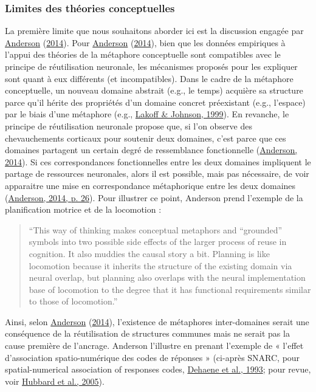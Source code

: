 \documentclass[
  a4paper,12pt,twoside,onecolumn,openright,final,oldfontcommands]{memoir}
\begin{document}
\hypertarget{lim-con}{%
\subsubsection{Limites des théories conceptuelles}\label{lim-con}}

La première limite que nous souhaitons aborder ici est la discussion engagée par \protect\hyperlink{ref-anderson_after_2014}{Anderson} (\protect\hyperlink{ref-anderson_after_2014}{2014}). Pour \protect\hyperlink{ref-anderson_after_2014}{Anderson} (\protect\hyperlink{ref-anderson_after_2014}{2014}), bien que les données empiriques à l'appui des théories de la métaphore conceptuelle sont compatibles avec le principe de réutilisation neuronale, les mécanismes proposés pour les expliquer sont quant à eux différents (et incompatibles). Dans le cadre de la métaphore conceptuelle, un nouveau domaine abstrait (e.g., le temps) acquière sa structure parce qu'il hérite des propriétés d'un domaine concret préexistant (e.g., l'espace) par le biais d'une métaphore (e.g., \protect\hyperlink{ref-lakoff_philosophy_1999}{Lakoff \& Johnson, 1999}). En revanche, le principe de réutilisation neuronale propose que, si l'on observe des chevauchements corticaux pour soutenir deux domaines, c'est parce que ces domaines partagent un certain degré de ressemblance fonctionnelle (\protect\hyperlink{ref-anderson_after_2014}{Anderson, 2014}). Si ces correspondances fonctionnelles entre les deux domaines impliquent le partage de ressources neuronales, alors il est possible, mais pas nécessaire, de voir apparaitre une mise en correspondance métaphorique entre les deux domaines (\protect\hyperlink{ref-anderson_after_2014}{Anderson, 2014, p. 26}). Pour illustrer ce point, Anderson prend l'exemple de la planification motrice et de la locomotion :

\begin{quote}
``This way of thinking makes conceptual metaphors and ``grounded'' symbols into two possible side effects of the larger process of reuse in cognition. It also muddies the causal story a bit. Planning is like locomotion because it inherits the structure of the existing domain via neural overlap, but planning also overlaps with the neural implementation base of locomotion to the degree that it has functional requirements similar to those of locomotion.''
\end{quote}

Ainsi, selon \protect\hyperlink{ref-anderson_after_2014}{Anderson} (\protect\hyperlink{ref-anderson_after_2014}{2014}), l'existence de métaphores inter-domaines serait une conséquence de la réutilisation de structures communes mais ne serait pas la cause première de l'ancrage. Anderson l'illustre en prenant l'exemple de « l'effet d'association spatio-numérique des codes de réponses » (ci-après SNARC, pour spatial-numerical association of responses codes, \protect\hyperlink{ref-dehaene_mental_1993}{Dehaene et al., 1993}; pour revue, voir \protect\hyperlink{ref-hubbard_interactions_2005}{Hubbard et al., 2005}).
\end{document}

